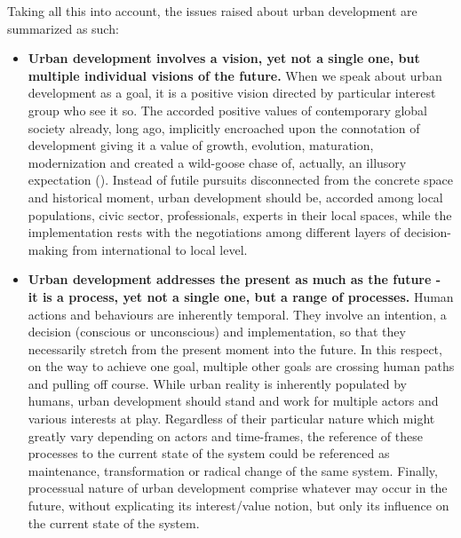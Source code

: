 \documentclass[11pt]{report}
\begin{document}
{{{Taking all this into account, the issues raised about urban development are summarized as such:

\begin{itemize}

\item \textbf{Urban development involves a vision, yet not a single one, but multiple individual visions of the future.}
When we speak about urban development as a goal, it is a positive vision directed by particular interest group who see it so.
The accorded positive values of contemporary global society already, long ago, implicitly encroached upon the connotation of development giving it a value of growth, evolution, maturation, modernization and created a wild-goose chase of, actually, an illusory expectation
(\href{Esteva}{\citealt{esteva_development_2010}}).
Instead of futile pursuits disconnected from the concrete space and historical moment, urban development should be, accorded among local populations, civic sector, professionals, experts in their local spaces, while the implementation rests with the negotiations among different layers of decision-making from international to local level.

\item \textbf{Urban development addresses the present as much as the future - it is a process, yet not a single one, but a range of processes.}
Human actions and behaviours are inherently temporal.
They involve an intention, a decision (conscious or unconscious) and implementation, so that they necessarily stretch from the present moment into the future. In this respect, on the way to achieve one goal, multiple other goals are crossing human paths and pulling off course.
While urban reality is inherently populated by humans, urban development should stand and work for multiple actors and various interests at play.
Regardless of their particular nature which might greatly vary depending on actors and time-frames, the reference of these processes to the current state of the system could be referenced as maintenance, transformation or radical change of the same system.
Finally, processual nature of urban development comprise whatever may occur in the future, without explicating its interest/value notion, but only its influence on the current state of the system.


\end{itemize}}}}
\end{document}
